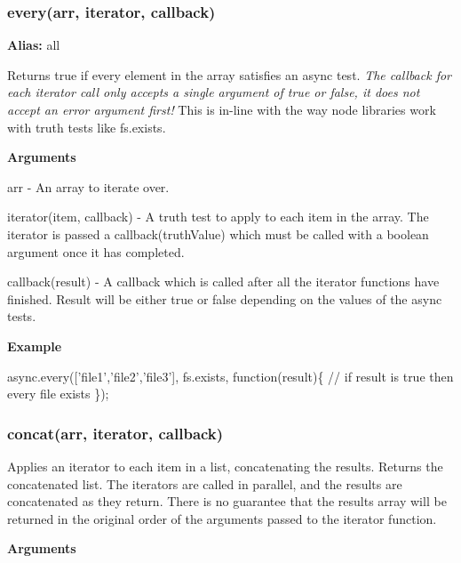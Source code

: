 \label{_every}%
 \subsubsection*{every(arr, iterator, callback)}

{\bfseries Alias\+:} all

Returns true if every element in the array satisfies an async test. {\itshape The callback for each iterator call only accepts a single argument of true or false, it does not accept an error argument first!} This is in-\/line with the way node libraries work with truth tests like fs.\+exists.

{\bfseries Arguments}


\begin{DoxyItemize}
\item arr -\/ An array to iterate over.
\item iterator(item, callback) -\/ A truth test to apply to each item in the array. The iterator is passed a callback(truth\+Value) which must be called with a boolean argument once it has completed.
\item callback(result) -\/ A callback which is called after all the iterator functions have finished. Result will be either true or false depending on the values of the async tests.
\end{DoxyItemize}

{\bfseries Example}


\begin{DoxyCode}
async.every([\textcolor{stringliteral}{'file1'},\textcolor{stringliteral}{'file2'},\textcolor{stringliteral}{'file3'}], fs.exists, \textcolor{keyword}{function}(result)\{
    \textcolor{comment}{// if result is true then every file exists}
\});
\end{DoxyCode}
 



\label{_concat}%
 \subsubsection*{concat(arr, iterator, callback)}

Applies an iterator to each item in a list, concatenating the results. Returns the concatenated list. The iterators are called in parallel, and the results are concatenated as they return. There is no guarantee that the results array will be returned in the original order of the arguments passed to the iterator function.

{\bfseries Arguments}


